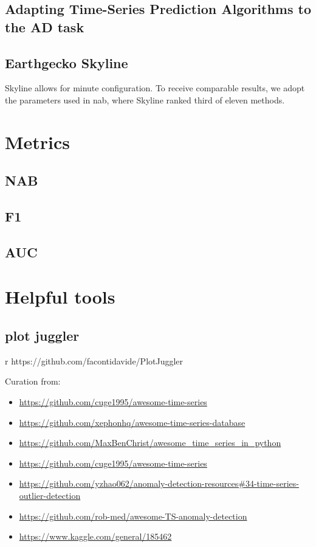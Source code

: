 \subsection{Adapting Time-Series Prediction Algorithms to the AD task}

\subsection{Earthgecko Skyline}
Skyline allows for minute configuration. To receive comparable results, we adopt
the parameters used in \gls{nab}, where Skyline ranked third of eleven methods.




\section{Metrics}
\subsection{NAB}
\subsection{F1}
\subsection{AUC}
\section{Helpful tools}
\subsection{plot juggler}r
https://github.com/facontidavide/PlotJuggler

Curation from:
\begin{itemize}
    \item \url{https://github.com/cuge1995/awesome-time-series}
    \item \url{https://github.com/xephonhq/awesome-time-series-database}
    \item \url{https://github.com/MaxBenChrist/awesome_time_series_in_python}
    \item \url{https://github.com/cuge1995/awesome-time-series}
    \item \url{https://github.com/yzhao062/anomaly-detection-resources#34-time-series-outlier-detection}
    \item \url{https://github.com/rob-med/awesome-TS-anomaly-detection}
    \item \url{https://www.kaggle.com/general/185462}
\end{itemize}


